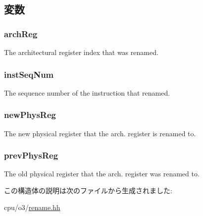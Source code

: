 \subsection{変数}
\hypertarget{structDefaultRename_1_1RenameHistory_af2dcd1f086448036cd37ed6b07aef4a9}{
\subsubsection[{archReg}]{ {\bf archReg}}}
\label{structDefaultRename_1_1RenameHistory_af2dcd1f086448036cd37ed6b07aef4a9}
The architectural register index that was renamed. \hypertarget{structDefaultRename_1_1RenameHistory_a901e3e07a1012b00cd5009167182714b}{
\subsubsection[{instSeqNum}]{ {\bf instSeqNum}}}
\label{structDefaultRename_1_1RenameHistory_a901e3e07a1012b00cd5009167182714b}
The sequence number of the instruction that renamed. \hypertarget{structDefaultRename_1_1RenameHistory_affb5690b8bee99a204256e0b772f51ac}{
\subsubsection[{newPhysReg}]{ {\bf newPhysReg}}}
\label{structDefaultRename_1_1RenameHistory_affb5690b8bee99a204256e0b772f51ac}
The new physical register that the arch. register is renamed to. \hypertarget{structDefaultRename_1_1RenameHistory_a8c356dbfbd6eb1576b5dcd8ac690497c}{
\subsubsection[{prevPhysReg}]{ {\bf prevPhysReg}}}
\label{structDefaultRename_1_1RenameHistory_a8c356dbfbd6eb1576b5dcd8ac690497c}
The old physical register that the arch. register was renamed to. 

この構造体の説明は次のファイルから生成されました:\begin{DoxyCompactItemize}
\item 
cpu/o3/\hyperlink{rename_8hh}{rename.hh}\end{DoxyCompactItemize}
